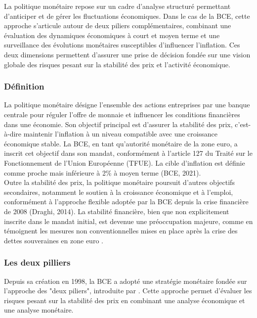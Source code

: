 La politique monétaire repose sur un cadre d’analyse structuré permettant d’anticiper et de gérer les fluctuations économiques. Dans le cas de la BCE, cette approche s’articule autour de deux piliers complémentaires, combinant une évaluation des dynamiques économiques à court et moyen terme et une surveillance des évolutions monétaires susceptibles d’influencer l’inflation. Ces deux dimensions permettent d’assurer une prise de décision fondée sur une vision globale des risques pesant sur la stabilité des prix et l’activité économique.

\subsubsection{Définition}

La politique monétaire désigne l’ensemble des actions entreprises par une banque centrale pour réguler l’offre de monnaie et influencer les conditions financières dans une économie. Son objectif principal est d’assurer la stabilité des prix, c’est-à-dire maintenir l’inflation à un niveau compatible avec une croissance économique stable. La  BCE, en tant qu’autorité monétaire de la zone euro, a inscrit cet objectif dans son mandat, conformément à l’article 127 du Traité sur le Fonctionnement de l’Union Européenne (TFUE). La cible d’inflation est définie comme proche mais inférieure à 2\% à moyen terme (BCE, 2021).\\

Outre la stabilité des prix, la politique monétaire poursuit d’autres objectifs secondaires, notamment le soutien à la croissance économique et à l’emploi, conformément à l’approche flexible adoptée par la BCE depuis la crise financière de 2008 (Draghi, 2014). La stabilité financière, bien que non explicitement inscrite dans le mandat initial, est devenue une préoccupation majeure, comme en témoignent les mesures non conventionnelles mises en place après la crise des dettes souveraines en zone euro \citep{smets2003}.

\subsubsection{Les deux pilliers}

Depuis sa création en 1998, la BCE a adopté une stratégie monétaire fondée sur l’approche des "deux piliers", introduite par \citep{issing2001}. Cette approche permet d’évaluer les risques pesant sur la stabilité des prix en combinant une analyse économique et une analyse monétaire.\\

